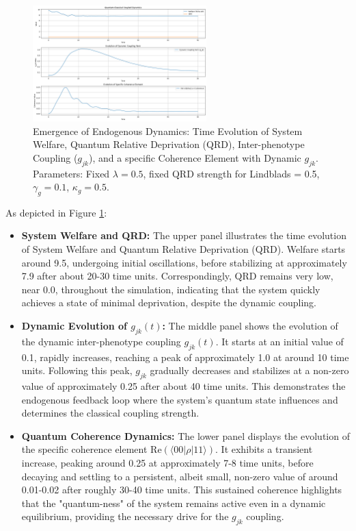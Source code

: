 \documentclass[9pt]{article}
\begin{document}
\begin{figure}[htbp]
    \centering
    \includegraphics[width=0.6\textwidth]{phenotourfig2.png}
    \caption{Emergence of Endogenous Dynamics: Time Evolution of System Welfare, Quantum Relative Deprivation (QRD), Inter-phenotype Coupling ($g_{jk}$), and a specific Coherence Element with Dynamic $g_{jk}$. Parameters: Fixed $\lambda = 0.5$, fixed QRD strength for Lindblads = 0.5, $\gamma_g = 0.1$, $\kappa_g = 0.5$.}
    \label{fig:dynamic_gjk_evolution}
\end{figure}

As depicted in Figure \ref{fig:dynamic_gjk_evolution}:
\begin{itemize}
    \item \textbf{System Welfare and QRD:} The upper panel illustrates the time evolution of System Welfare and Quantum Relative Deprivation (QRD). Welfare starts around 9.5, undergoing initial oscillations, before stabilizing at approximately 7.9 after about 20-30 time units. Correspondingly, QRD remains very low, near 0.0, throughout the simulation, indicating that the system quickly achieves a state of minimal deprivation, despite the dynamic coupling.
    \item \textbf{Dynamic Evolution of $g_{jk}(t)$:} The middle panel shows the evolution of the dynamic inter-phenotype coupling $g_{jk}(t)$. It starts at an initial value of 0.1, rapidly increases, reaching a peak of approximately 1.0 at around 10 time units. Following this peak, $g_{jk}$ gradually decreases and stabilizes at a non-zero value of approximately 0.25 after about 40 time units. This demonstrates the endogenous feedback loop where the system's quantum state influences and determines the classical coupling strength.
    \item \textbf{Quantum Coherence Dynamics:} The lower panel displays the evolution of the specific coherence element $\text{Re}(\langle 00|\rho|11\rangle)$. It exhibits a transient increase, peaking around 0.25 at approximately 7-8 time units, before decaying and settling to a persistent, albeit small, non-zero value of around 0.01-0.02 after roughly 30-40 time units. This sustained coherence highlights that the "quantum-ness" of the system remains active even in a dynamic equilibrium, providing the necessary drive for the $g_{jk}$ coupling.
\end{itemize}
\end{document}
